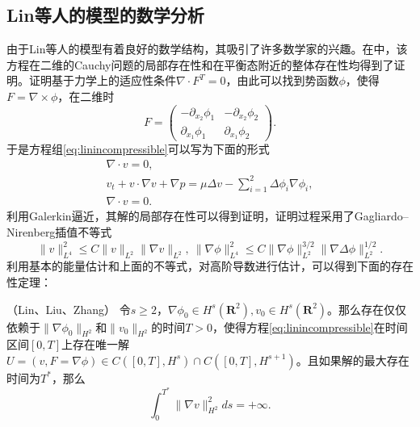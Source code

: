 \subsection{Lin等人的模型的数学分析}
由于Lin等人的模型有着良好的数学结构，其吸引了许多数学家的兴趣\cite{lin2005hydrodynamics,lebon2008classical,qian2010well,qian2011initial,hu2012formation,hu2015global}。在\cite{lin2005hydrodynamics}中，该方程在二维的Cauchy问题的局部存在性和在平衡态附近的整体存在性均得到了证明。证明基于力学上的适应性条件$\nabla \cdot F^T=0$，由此可以找到势函数$\phi$，使得$F = \nabla \times \phi$，在二维时
\begin{equation*}
	F = \left( \begin{matrix}
		-\partial_{x_2} \phi_1 &　-\partial_{x_2} \phi_2 \\
		\partial_{x_1} \phi_1 & \partial_{x_1} \phi_2
	\end{matrix}\right).
\end{equation*}
于是方程组\eqref{eq:linincompressible}可以写为下面的形式
\begin{eqnarray*}
	\nabla \cdot v = 0, \\
	v_t + v \cdot \nabla v + \nabla p =  \mu \Delta v - \sum_{i=1}^2 \Delta \phi_i \nabla \phi_i, \\
	\nabla \cdot v = 0.
\end{eqnarray*}
利用Galerkin逼近，其解的局部存在性可以得到证明\cite{lin2005hydrodynamics}，证明过程采用了Gagliardo–Nirenberg插值不等式
\begin{equation*}
	\|v\|_{L^4}^2 \le C \|v\|_{L^2} \| \nabla v\|_{L^2} ,\ \|\nabla \phi\|_{L^4}^2 \le C \|\nabla \phi\|_{L^2}^{3/2} \|\nabla \Delta \phi\|_{L^2}^{1/2}.
\end{equation*}
利用基本的能量估计和上面的不等式，对高阶导数进行估计，可以得到下面的存在性定理：
\begin{theorem}（Lin、Liu、Zhang\cite{lin2005hydrodynamics}）
	令$s \ge 2$，$\nabla \phi_0 \in H^s(\mathbf{R}^2),v_0 \in H^s(\mathbf{R}^2)$。那么存在仅仅依赖于$\|\nabla \phi_0\|_{H^2}$和$\|v_0\|_{H^2}$的时间$T>0$，使得方程\eqref{eq:linincompressible}在时间区间$[0,T]$上存在唯一解$U=(v,F=\nabla \phi) \in C([0,T],H^s) \cap C([0,T],H^{s+1})$。且如果解的最大存在时间为$T^*$，那么
	\begin{equation*}
		\int_0^{T^*} \|\nabla v\|_{H^2}^2 ds = + \infty.
	\end{equation*}
\end{theorem}

